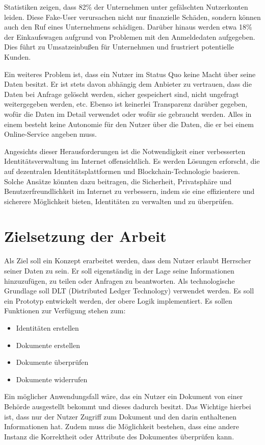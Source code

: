 Statistiken \cite{ID11} zeigen, dass 82\% der Unternehmen unter gefälschten Nutzerkonten leiden. Diese Fake-User verursachen nicht nur finanzielle Schäden, sondern können auch den Ruf eines Unternehmens schädigen. Darüber hinaus werden etwa 18\% der Einkaufswagen aufgrund von Problemen mit den Anmeldedaten aufgegeben. Dies führt zu Umsatzeinbußen für Unternehmen und frustriert potentielle Kunden.

Ein weiteres Problem ist, dass ein Nutzer im Status Quo keine Macht über seine Daten besitzt. Er ist stets davon abhängig dem Anbieter zu vertrauen, dass die Daten bei Anfrage gelöscht werden, sicher gespeichert sind, nicht ungefragt weitergegeben werden, etc. Ebenso ist keinerlei Transparenz darüber gegeben, wofür die Daten im Detail verwendet oder wofür sie gebraucht werden. Alles in einem besteht keine Autonomie für den Nutzer über die Daten, die er bei einem Online-Service angeben muss.

Angesichts dieser Herausforderungen ist die Notwendigkeit einer verbesserten Identitätsverwaltung im Internet offensichtlich. Es werden Lösungen erforscht, die auf dezentralen Identitätsplattformen und Blockchain-Technologie basieren. Solche Ansätze könnten dazu beitragen, die Sicherheit, Privatsphäre und Benutzerfreundlichkeit im Internet zu verbessern, indem sie eine effizientere und sicherere Möglichkeit bieten, Identitäten zu verwalten und zu überprüfen.

\section{Zielsetzung der Arbeit}
\label{zielsetzung}
Als Ziel soll ein Konzept erarbeitet werden, dass dem Nutzer erlaubt Herrscher seiner
Daten zu sein. Er soll eigenständig in der Lage seine Informationen hinzuzufügen, zu
teilen oder Anfragen zu beantworten. Als technologische Grundlage soll DLT (Distributed Ledger Technology) verwendet werden. Es soll ein Prototyp entwickelt werden, der obere Logik implementiert. Es sollen Funktionen zur Verfügung stehen zum:
\begin{itemize}
	\item Identitäten erstellen
	\item Dokumente erstellen
	\item Dokumente überprüfen
	\item Dokumente widerrufen
\end{itemize}
Ein möglicher Anwendungsfall wäre, das ein Nutzer ein Dokument von einer Behörde ausgestellt bekommt und dieses dadurch besitzt. Das Wichtige hierbei ist, dass nur der Nutzer Zugriff zum Dokument und den darin enthaltenen Informationen hat. Zudem muss die Möglichkeit bestehen, dass eine andere Instanz die Korrektheit oder Attribute des Dokumentes überprüfen kann.

